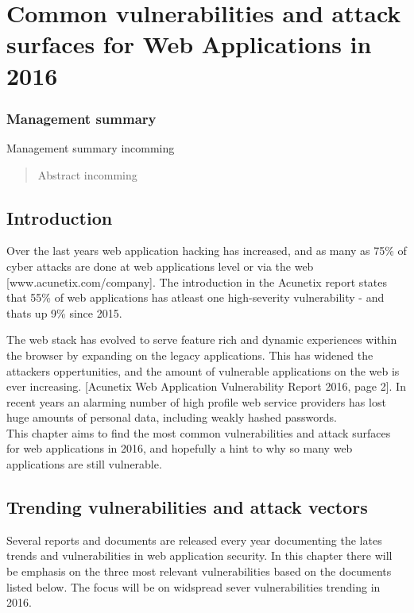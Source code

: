 \chapter[Web Application vulnerabilities in 2016]{Common vulnerabilities and attack surfaces for Web Applications in 2016}

\subsection*{Management summary}
Management summary incomming
 
\begin{abstract}
Abstract incomming
\end{abstract}


\section{Introduction}
Over the last years web application hacking has increased, and as many as 75\% of cyber attacks are done at web applications level or via the web [www.acunetix.com/company]. The introduction in the Acunetix report states that 55\% of web applications has atleast one high-severity vulnerability - and thats up 9\% since 2015.

The web stack has evolved to serve feature rich and dynamic experiences within the browser by expanding on the legacy applications. This has widened the attackers oppertunities, and the amount of vulnerable applications on the web is ever increasing. [Acunetix Web Application Vulnerability Report 2016, page 2]. In recent years an alarming number of high profile web service providers has lost huge amounts of personal data, including weakly hashed passwords. \\ This chapter aims to find the most common vulnerabilities and attack surfaces for web applications in 2016, and hopefully a hint to why so many web applications are still vulnerable.
\section{Trending vulnerabilities and attack vectors}
Several reports and documents are released every year documenting the lates trends and vulnerabilities in web application security. In this chapter there will be emphasis on the three most relevant vulnerabilities based on the documents listed below. The focus will be on widspread sever vulnerabilities trending in 2016. 
\pagebreak
